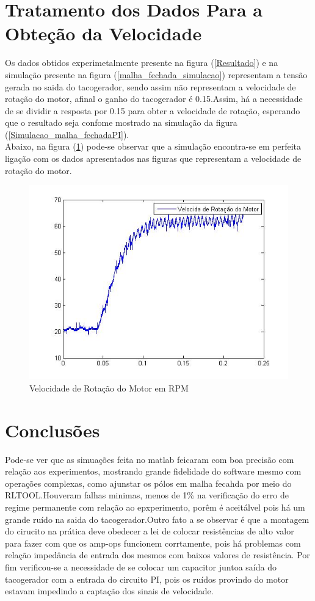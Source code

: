 \documentclass[11pt, a4paper, oneside]{article}
\begin{document}
\newpage

\section{Tratamento dos Dados Para a Obteção da Velocidade}
Os dados obtidos experimetalmente presente na figura (\ref{Resultado}) e na simulação presente na figura (\ref{malha_fechada_simulacao}) representam a tensão gerada no saida do tacogerador, sendo assim não representam a velocidade de rotação do motor, afinal o ganho do tacogerador é 0.15.Assim, há a necessidade de se dividir a resposta por 0.15 para obter a velocidade de rotação, esperando que o resultado seja confome mostrado na simulação da figura (\ref{Simulacao_malha_fechadaPI}).\\
Abaixo, na figura (\ref{vel_rotacao_dados}) pode-se observar que a simulação encontra-se em perfeita ligação com os dados apresentados nas figuras que representam a velocidade de rotação do motor.

\begin{figure}[h!]
\centering
\includegraphics[width=.6\linewidth]{Velocidade_real_do_motor_experimental.jpg}
\caption{Velocidade de Rotação do Motor em RPM}	
\label{vel_rotacao_dados}
\end{figure}

\section{Conclusões}
Pode-se ver que as simuações feita no matlab feicaram com boa precisão com relação aos experimentos, mostrando grande fidelidade do software mesmo com operações complexas, como ajunstar os pólos em malha fecahda por meio do RLTOOL.Houveram falhas minimas, menos de 1\% na  verificação do erro de regime permanente com relação ao epxperimento, porêm é aceitálvel pois há um grande ruído na saida do tacogerador.Outro fato a se observar é que a montagem do cirucito na prática deve obedecer a lei de colocar resistências de alto valor para fazer com que os amp-ops funcionem corrtamente, pois há problemas com relação  impedância de entrada dos mesmos com baixos valores de resistência.
Por fim verificou-se a necessidade de se colocar um capacitor juntoa saída do tacogerador com a entrada do circuito PI, pois os ruídos provindo do motor estavam impedindo a captação dos sinais de velocidade.\\
\end{document}
